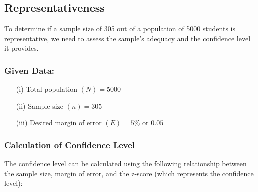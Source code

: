 \subsection{Representativeness}

To determine if a sample size of 305 out of a population of 5000 students is representative, we need to assess the sample's adequacy and the confidence level it provides.

\subsubsection*{Given Data:}

\begin{enumerate}
    \item[(i)] Total population $(N) = 5000$
    \item[(ii)] Sample size $(n) = 305$
    \item[(iii)] Desired margin of error $(E) = 5\%$ or $0.05$
\end{enumerate}

\subsubsection*{Calculation of Confidence Level}

The confidence level can be calculated using the following relationship between the sample size, margin of error, and the z-score (which represents the confidence level):

